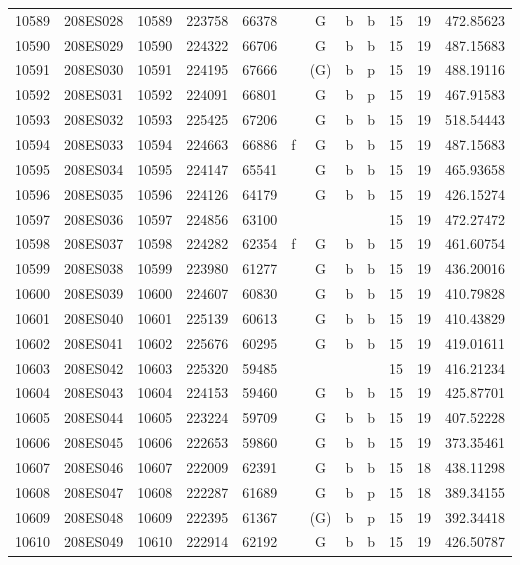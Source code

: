 \begin{tabular}{|*{12}{c|}}
10589 & 208ES028 & 10589 & 223758 & 66378 &  & G & b & b & 15 & 19 & 472.85623 \\ 
10590 & 208ES029 & 10590 & 224322 & 66706 &  & G & b & b & 15 & 19 & 487.15683 \\ 
10591 & 208ES030 & 10591 & 224195 & 67666 &  & (G) & b & p & 15 & 19 & 488.19116 \\ 
10592 & 208ES031 & 10592 & 224091 & 66801 &  & G & b & p & 15 & 19 & 467.91583 \\ 
10593 & 208ES032 & 10593 & 225425 & 67206 &  & G & b & b & 15 & 19 & 518.54443 \\ 
10594 & 208ES033 & 10594 & 224663 & 66886 & f & G & b & b & 15 & 19 & 487.15683 \\ 
10595 & 208ES034 & 10595 & 224147 & 65541 &  & G & b & b & 15 & 19 & 465.93658 \\ 
10596 & 208ES035 & 10596 & 224126 & 64179 &  & G & b & b & 15 & 19 & 426.15274 \\ 
10597 & 208ES036 & 10597 & 224856 & 63100 &  &  &  &  & 15 & 19 & 472.27472 \\ 
10598 & 208ES037 & 10598 & 224282 & 62354 & f & G & b & b & 15 & 19 & 461.60754 \\ 
10599 & 208ES038 & 10599 & 223980 & 61277 &  & G & b & b & 15 & 19 & 436.20016 \\ 
10600 & 208ES039 & 10600 & 224607 & 60830 &  & G & b & b & 15 & 19 & 410.79828 \\ 
10601 & 208ES040 & 10601 & 225139 & 60613 &  & G & b & b & 15 & 19 & 410.43829 \\ 
10602 & 208ES041 & 10602 & 225676 & 60295 &  & G & b & b & 15 & 19 & 419.01611 \\ 
10603 & 208ES042 & 10603 & 225320 & 59485 &  &  &  &  & 15 & 19 & 416.21234 \\ 
10604 & 208ES043 & 10604 & 224153 & 59460 &  & G & b & b & 15 & 19 & 425.87701 \\ 
10605 & 208ES044 & 10605 & 223224 & 59709 &  & G & b & b & 15 & 19 & 407.52228 \\ 
10606 & 208ES045 & 10606 & 222653 & 59860 &  & G & b & b & 15 & 19 & 373.35461 \\ 
10607 & 208ES046 & 10607 & 222009 & 62391 &  & G & b & b & 15 & 18 & 438.11298 \\ 
10608 & 208ES047 & 10608 & 222287 & 61689 &  & G & b & p & 15 & 18 & 389.34155 \\ 
10609 & 208ES048 & 10609 & 222395 & 61367 &  & (G) & b & p & 15 & 19 & 392.34418 \\ 
10610 & 208ES049 & 10610 & 222914 & 62192 &  & G & b & b & 15 & 19 & 426.50787 \\ 

\end{tabular}
